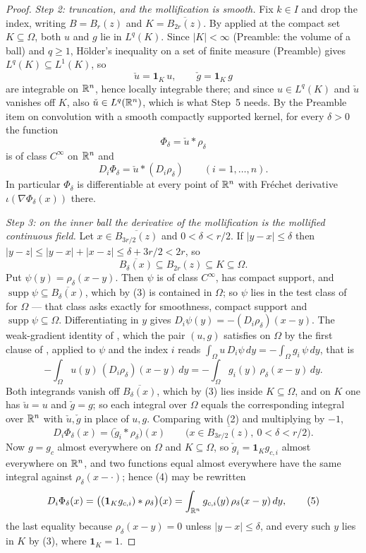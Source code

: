 \begin{proof}
\medskip
\noindent\emph{Step 2: truncation, and the mollification is smooth.}  Fix
$k\in I$ and drop the index, writing $B=B_r(z)$ and $K=\overline{B_{2r}(z)}$.
By  applied at the compact set $K\subseteq\Omega$, both
$u$ and $g$ lie in $L^{q}(K)$.  Since $|K|<\infty$ (Preamble: the volume of a
ball) and $q\ge1$, H\"older's inequality on a set of finite measure (Preamble)
gives $L^{q}(K)\subseteq L^{1}(K)$, so
\[
\check u=\mathbf1_K\,u,
\qquad
\check g=\mathbf1_K\,g
\]
are integrable on $\mathbb{R}^n$, hence locally integrable there; and since
$u\in L^{q}(K)$ and $\check u$ vanishes off $K$, also
$\check u\in L^{q}(\mathbb{R}^n)$, which is what Step~5 needs.  By the Preamble item
on convolution with a smooth compactly supported kernel, for every $\delta>0$
the function
\[
\Phi_\delta=\check u*\rho_\delta
\]
is of class $C^\infty$ on $\mathbb{R}^n$ and
\[
D_i\Phi_\delta=\check u*(D_i\rho_\delta)
\qquad(i=1,\dots,n).
\tag{2}
\]
In particular $\Phi_\delta$ is differentiable at every point of $\mathbb{R}^n$ with
Fr\'echet derivative $\iota(\nabla\Phi_\delta(x))$ there.

\medskip
\noindent\emph{Step 3: on the inner ball the derivative of the mollification is
the mollified continuous field.}  Let $x\in\overline{B_{3r/2}(z)}$ and
$0<\delta<r/2$.  If $|y-x|\le\delta$ then
$|y-z|\le|y-x|+|x-z|\le\delta+3r/2<2r$, so
\[
\overline{B_\delta(x)}\subseteq B_{2r}(z)\subseteq K\subseteq\Omega .
\tag{3}
\]
Put $\psi(y)=\rho_\delta(x-y)$.  Then $\psi$ is of class $C^\infty$, has
compact support, and $\operatorname{supp}\psi\subseteq\overline{B_\delta(x)}$,
which by (3) is contained in $\Omega$; so $\psi$ lies in the test class of
 for $\Omega$ --- that class asks exactly for
smoothness, compact support and $\operatorname{supp}\psi\subseteq\Omega$.
Differentiating in $y$ gives $D_i\psi(y)=-(D_i\rho_\delta)(x-y)$.  The
weak-gradient identity of , which the pair $(u,g)$
satisfies on $\Omega$ by the first clause of , applied to
$\psi$ and the index $i$ reads
$\int_\Omega u\,D_i\psi\,dy=-\int_\Omega g_i\,\psi\,dy$, that is
\[
-\int_\Omega u(y)\,(D_i\rho_\delta)(x-y)\,dy
=-\int_\Omega g_i(y)\,\rho_\delta(x-y)\,dy .
\]
Both integrands vanish off $\overline{B_\delta(x)}$, which by (3) lies inside
$K\subseteq\Omega$, and on $K$ one has $\check u=u$ and $\check g=g$; so each
integral over $\Omega$ equals the corresponding integral over $\mathbb{R}^n$ with
$\check u,\check g$ in place of $u,g$.  Comparing with (2) and multiplying by
$-1$,
\[
D_i\Phi_\delta(x)=\bigl(\check g_i*\rho_\delta\bigr)(x)
\qquad\bigl(x\in\overline{B_{3r/2}(z)},\ 0<\delta<r/2\bigr).
\tag{4}
\]
Now $g=g_c$ almost everywhere on $\Omega$ and $K\subseteq\Omega$, so
$\check g_i=\mathbf1_Kg_{c,i}$ almost everywhere on $\mathbb{R}^n$, and two functions
equal almost everywhere have the same integral against $\rho_\delta(x-\cdot)$;
hence (4) may be rewritten
\[
D_i\Phi_\delta(x)=\bigl((\mathbf1_Kg_{c,i})*\rho_\delta\bigr)(x)
=\int_{\mathbb{R}^n}g_{c,i}(y)\,\rho_\delta(x-y)\,dy ,
\tag{5}
\]
the last equality because $\rho_\delta(x-y)=0$ unless $|y-x|\le\delta$, and
every such $y$ lies in $K$ by (3), where $\mathbf1_K=1$.


\end{proof}
